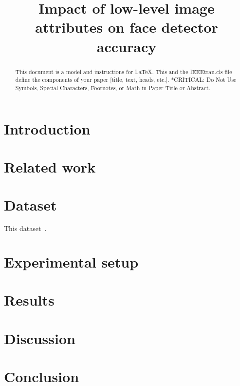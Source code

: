 \documentclass[conference]{IEEEtran}
\begin{document}
\title{Impact of low-level image attributes on face detector accuracy}

\maketitle

\begin{abstract}
This document is a model and instructions for \LaTeX.
This and the IEEEtran.cls file define the components of your paper [title, text, heads, etc.]. *CRITICAL:
Do Not Use Symbols, Special Characters, Footnotes, or Math in Paper Title or Abstract.
\end{abstract}

\begin{IEEEkeywords}
\end{IEEEkeywords}

\section{Introduction}




\section{Related work} %


\section{Dataset} %

This dataset~\cite{geofacial}.


\section{Experimental setup}


\section{Results}

\section{Discussion}


\section{Conclusion}



\end{document}
